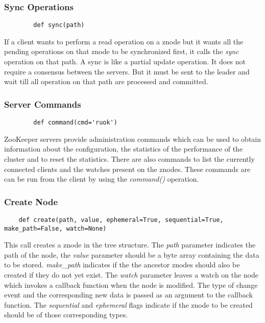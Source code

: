   \subsubsection{Sync Operations}
  	\begin{lstlisting}
  		def sync(path)
  	\end{lstlisting}
  	If a client wants to perform a read operation on a znode but it wants all the pending operations on that znode to be synchronized first, it calls the \textit{sync} operation on that path. A sync is like a partial update operation. It does not require a consensus between the servers. But it must be sent to the leader and wait till all operation on that path are processed and committed. 

  \subsubsection{Server Commands}
  	\begin{lstlisting}
  		def command(cmd='ruok')
  	\end{lstlisting}
  	ZooKeeper servers provide administration commands which can be used to obtain information about the configuration, the statistics of the performance of the cluster and to reset the statistics. There are also commands to list the currently connected clients and the watches present on the znodes. These commands are can be run from the client by using the \textit{command()} operation.

  \subsubsection{Create Node}
  \begin{lstlisting}
    def create(path, value, ephemeral=True, sequential=True, make_path=False, watch=None)
  \end{lstlisting}
  This call creates a znode in the tree structure. The \textit{path} parameter indicates the path of the node, the \textit{value} parameter should be a byte array containing the data to be stored. \textit{make\_path} indicates if the the ancestor znodes should also be created if they do not yet exist. The \textit{watch} parameter leaves a watch on the node which invokes a callback function when the node is modified. The type of change event and the corresponding new data is passed as an argument to the callback function. The \textit{sequential} and \textit{ephemeral} flags indicate if the znode to be created should be of those corresponding types.
  
